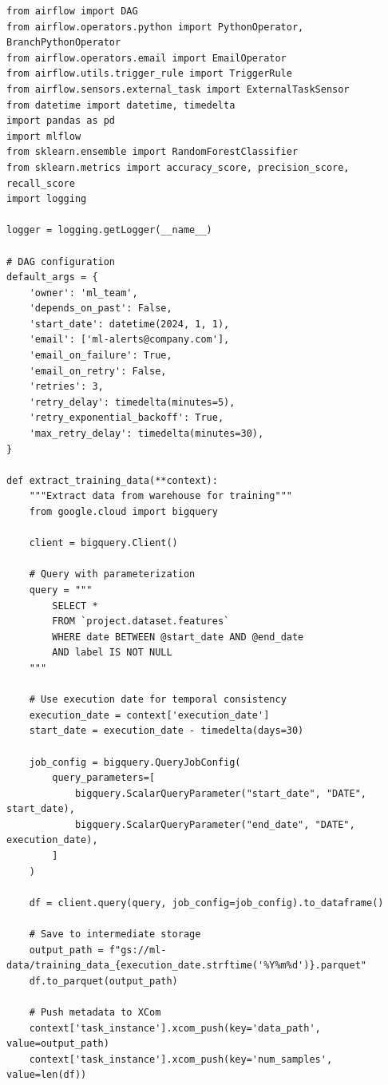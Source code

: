 \begin{lstlisting}[style=python, caption=Comprehensive Airflow ML pipeline with error handling]
from airflow import DAG
from airflow.operators.python import PythonOperator, BranchPythonOperator
from airflow.operators.email import EmailOperator
from airflow.utils.trigger_rule import TriggerRule
from airflow.sensors.external_task import ExternalTaskSensor
from datetime import datetime, timedelta
import pandas as pd
import mlflow
from sklearn.ensemble import RandomForestClassifier
from sklearn.metrics import accuracy_score, precision_score, recall_score
import logging

logger = logging.getLogger(__name__)

# DAG configuration
default_args = {
    'owner': 'ml_team',
    'depends_on_past': False,
    'start_date': datetime(2024, 1, 1),
    'email': ['ml-alerts@company.com'],
    'email_on_failure': True,
    'email_on_retry': False,
    'retries': 3,
    'retry_delay': timedelta(minutes=5),
    'retry_exponential_backoff': True,
    'max_retry_delay': timedelta(minutes=30),
}

def extract_training_data(**context):
    """Extract data from warehouse for training"""
    from google.cloud import bigquery

    client = bigquery.Client()

    # Query with parameterization
    query = """
        SELECT *
        FROM `project.dataset.features`
        WHERE date BETWEEN @start_date AND @end_date
        AND label IS NOT NULL
    """

    # Use execution date for temporal consistency
    execution_date = context['execution_date']
    start_date = execution_date - timedelta(days=30)

    job_config = bigquery.QueryJobConfig(
        query_parameters=[
            bigquery.ScalarQueryParameter("start_date", "DATE", start_date),
            bigquery.ScalarQueryParameter("end_date", "DATE", execution_date),
        ]
    )

    df = client.query(query, job_config=job_config).to_dataframe()

    # Save to intermediate storage
    output_path = f"gs://ml-data/training_data_{execution_date.strftime('%Y%m%d')}.parquet"
    df.to_parquet(output_path)

    # Push metadata to XCom
    context['task_instance'].xcom_push(key='data_path', value=output_path)
    context['task_instance'].xcom_push(key='num_samples', value=len(df))


\end{lstlisting}
